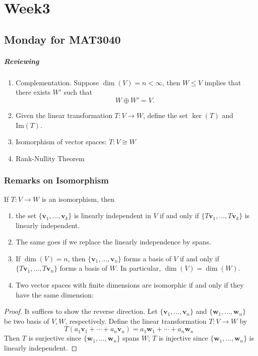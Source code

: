 
\chapter{Week3}
\section{Monday for MAT3040}
\paragraph{Reviewing}
\begin{enumerate}
\item
Complementation. 
Suppose $\dim(V)=n<\infty$, then $W\le V$ implies that there exists $W'$ such that
\[
W\oplus W'=V.
\]
\item
Given the linear transformation $T:V\to W$, define the set  $\ker(T)$ and $\text{Im}(T)$.
\item
Isomorphism of vector spaces:
$
T:V\cong W
$
\item
Rank-Nullity Theorem
\end{enumerate}
\subsection{Remarks on Isomorphism}
\begin{proposition}\label{Pro:3:1}
If $T:V\to W$ is an isomorphism, then 
\begin{enumerate}
\item
the set $\{\bm v_1,\dots,\bm v_k\}$ is linearly independent in $V$ 
if and only if $\{T\bm v_1,\dots,T\bm v_k\}$ is linearly independent.
\item
The same goes if we replace the linearly independence by spans.
\item
If $\dim(V)=n$, then $\{\bm v_1,\dots,\bm v_n\}$ forms a basis of $V$ 
if and only if $\{T\bm v_1,\dots,T\bm v_n\}$ forms a basis of $W$. 
In particular, $\dim(V)=\dim(W)$.
\item
Two vector spaces with finite dimensions are isomorphic if and only if they have the same dimension:
\end{enumerate}
\end{proposition}
\begin{proof}
It suffices to show the reverse direction. Let $\{\bm v_1,\dots,\bm v_n\}$ and $\{\bm w_1,\dots,\bm w_n\}$ be two basis of $V,W$, respectively. Define the linear transformation $T:V\to W$ by
\[
T(a_1\bm v_1+\cdots+a_n\bm v_n)=a_1\bm w_1+\cdots+a_n\bm w_n
\]
Then $T$ is surjective since $\{\bm w_1,\dots,\bm w_n\}$ spans $W$; $T$ is injective since $\{\bm w_1,\dots,\bm w_n\}$ is linearly independent.
\end{proof}

